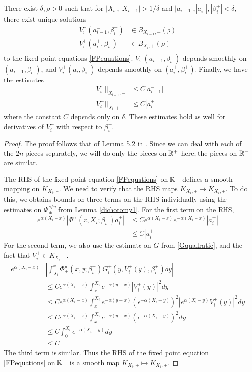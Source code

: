 \documentclass[thesis.tex]{subfiles}
\begin{document}

\begin{lemma}\label{solveforV}
There exist $\delta, \rho > 0$ such that for $|X_i|, |X_{i-1}| > 1/\delta$ and $|a_{i-1}^-|, |a_i^+|, |\beta_i^\pm| < \delta$, there exist unique solutions
\begin{align*}
V_i^-(a_{i-1}^-, \beta_i^-) &\in B_{X_{i-1}, -}(\rho) \\
V_i^+(a_i^+, \beta_i^+) &\in B_{X_i, +}(\rho) \\
\end{align*}
to the fixed point equations \eqref{FPequations}. $V_i^-(a_{i-1}, \beta_i^-)$ depends smoothly on $(a_{i-1}^-, \beta_i^-)$, and $V_i^+(a_i, \beta_i^+)$ depends smoothly on $(a_i^+, \beta_i^+)$. Finally, we have the estimates
\begin{equation}\label{Vest}
\begin{aligned}
||V_i^-||_{X_{i-1}, -} &\leq C |a_{i-1}^-| \\
||V_i^+||_{X_i, +} &\leq C |a_i^+|
\end{aligned}
\end{equation}
where the constant $C$ depends only on $\delta$. These estimates hold as well for derivatives of $V_i^\pm$ with respect to $\beta_i^\pm$.
\begin{proof}
The proof follows that of Lemma 5.2 in \cite{Sandstede1997}. Since we can deal with each of the $2n$ pieces separately, we will do only the pieces on $\mathbb{R}^+$ here; the pieces on $\mathbb{R}^-$ are similar.

The RHS of the fixed point equation \eqref{FPequations} on $\mathbb{R}^+$ defines a smooth mapping on $K_{X_i, +}$. We need to verify that the RHS maps $K_{X_i, +} \mapsto K_{X_i, +}$. To do this, we obtains bounds on three terms on the RHS individually using the estimates on $\Phi^{s/u}_\pm$ from Lemma \ref{dichotomy1}. For the first term on the RHS,
\begin{align*}
e^{\alpha(X_i - x)} | \Phi^u_+(x, X_i; \beta_i^+) a_i^+ | 
&\leq C e^{\alpha(X_i - x)} e^{-\alpha(X_i - x)} |a_i^+| \\
&\leq C |a_i^+|
\end{align*}
For the second term, we also use the estimate on $G$ from \eqref{Gquadratic}, and the fact that $V_i^+ \in K_{X_i, +}$. 
\begin{align*}
e^{\alpha(X_i - x)} &\left| \int_{X_i}^x \Phi_+^u(x, y; \beta_i^+) G_i^+(y, V_i^+(y),\beta_i^+)dy  \right| \\
&\leq C e^{\alpha(X_i - x)} \int_x^{X_i} e^{-\alpha(y - x)}|V_i^+(y)|^2 dy \\
&\leq C e^{\alpha(X_i - x)} \int_x^{X_i} 
e^{-\alpha(y - x)}(e^{-\alpha(X_i - y)})^2|e^{\alpha(X_i - y)} V_i^+(y)|^2 dy \\
&\leq C e^{\alpha(X_i - x)} \int_x^{X_i} 
e^{-\alpha(y - x)}(e^{-\alpha(X_i - y)})^2 dy \\
&\leq C \int_0^{X_i} e^{-\alpha (X_i - y)} dy \\
&\leq C
\end{align*}
The third term is similar. Thus the RHS of the fixed point equation \eqref{FPequations} on $\mathbb{R}^+$ is a smooth map $K_{X_i, +} \mapsto K_{X_i, +}$. 


\end{proof}
\end{lemma}
\end{document}
